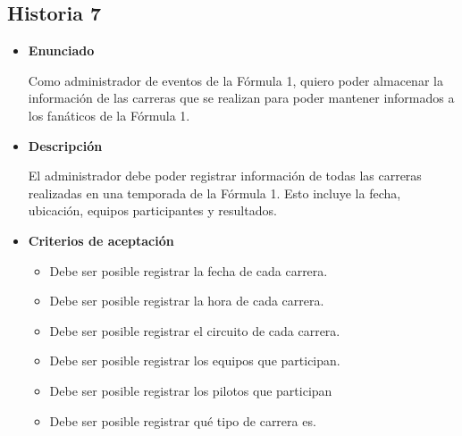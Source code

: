 \documentclass{article}
\begin{document}
	\subsection{Historia 7}
	\begin{itemize}
		
		\item \large{\textbf{Enunciado}}
		\begin{description}
			Como administrador de eventos de la Fórmula 1, quiero poder almacenar la información de las carreras que se realizan para poder mantener informados a los fanáticos de la Fórmula 1.
			
		\end{description}
		
		\item \large{\textbf{Descripción}}
		\begin{description}
			El administrador debe poder registrar información de todas las carreras realizadas en una temporada de la Fórmula 1. Esto incluye la fecha, ubicación, equipos participantes y resultados. 
			
		\end{description}
		
		\item \large{\textbf{Criterios de aceptación}}
		\begin{itemize}
			\item Debe ser posible registrar la fecha de cada carrera.
			\item Debe ser posible registrar la hora de cada carrera.
			\item Debe ser posible registrar el circuito de cada carrera. 
			\item Debe ser posible registrar los equipos que participan.
			\item Debe ser posible registrar los pilotos que participan
			\item Debe ser posible registrar qué tipo de carrera es. 
			
		\end{itemize}
		
	\end{itemize}
	
\end{document}
